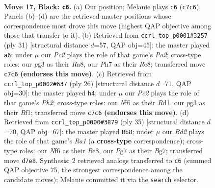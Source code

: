 \documentclass[11pt]{article}
\begin{document}
\clearpage

\begin{figure}[p]\centering
\begin{subfigure}{0.46\textwidth}\centering
\resizebox{\linewidth}{!}{%
\newchessgame
\chessboard[
  setfen={rr1q2k1/p1pb1ppp/4pn2/p7/2BPP2P/1P1Q1NP1/P4P2/R3R1K1 b - - 2 17},
  showmover=false,
  pgfstyle=straightmove, color=movearrow, markmove={c7-c6}
]}
\caption{}
\end{subfigure}\hfill
\begin{subfigure}{0.46\textwidth}\centering
\resizebox{\linewidth}{!}{%
\newchessgame
\chessboard[
  setfen={r3r1k1/pp1qbpp1/3ppn1p/8/P1PN4/3PB2P/1P2QPP1/R2R2K1 b - - 2 16},
  showmover=false,
  pgfstyle=straightmove, color=movearrow, markmove={a7-a6}
]}
\caption{}
\end{subfigure}
\\[4pt]
\begin{subfigure}{0.46\textwidth}\centering
\resizebox{\linewidth}{!}{%
\newchessgame
\chessboard[
  setfen={r3k2r/p1ppq1bp/1p2pnp1/8/2P5/P1N1PP2/1PQ3PP/1K1R1B1R w kq - 1 14},
  showmover=false,
  pgfstyle=straightmove, color=movearrow, markmove={h2-h4}
]}
\caption{}
\end{subfigure}\hfill
\begin{subfigure}{0.46\textwidth}\centering
\resizebox{\linewidth}{!}{%
\newchessgame
\chessboard[
  setfen={r2qr1k1/5pbp/p2p1np1/2pP4/P3P3/2NQ3P/1P3PP1/R1B2RK1 b - - 0 18},
  showmover=false,
  pgfstyle=straightmove, color=movearrow, markmove={a8-b8}
]}
\caption{}
\end{subfigure}
\caption{\textbf{Move 17, Black: \texttt{c6}.} (a) Our position; Melanie plays \texttt{c6} (\texttt{c7c6}). Panels (b)--(d) are the retrieved master positions whose correspondence most drove this move (highest QAP objective among those that transfer to it). (b) Retrieved from \texttt{ccrl\_top\_p0001\#3257} (ply 31) [structural distance $d$=57, QAP obj=45]: the master played \texttt{a6}; under $\mu$ our \emph{Pc2} plays the role of that game's \emph{Pa2}; cross-type roles: our \emph{p}g3 as their \emph{R}a8, our \emph{P}h7 as their \emph{R}e8; transferred move \texttt{c7c6} \textbf{(endorses this move)}. (c) Retrieved from \texttt{ccrl\_top\_p0002\#637} (ply 26) [structural distance $d$=71, QAP obj=30]: the master played \texttt{h4}; under $\mu$ our \emph{Pc2} plays the role of that game's \emph{Ph2}; cross-type roles: our \emph{N}f6 as their \emph{R}d1, our \emph{p}g3 as their \emph{B}f1; transferred move \texttt{c7c6} \textbf{(endorses this move)}. (d) Retrieved from \texttt{ccrl\_top\_p0000\#3879} (ply 35) [structural distance $d$=70, QAP obj=67]: the master played \texttt{Rb8}; under $\mu$ our \emph{Bd2} plays the role of that game's \emph{Ra1} (a \textbf{cross-type} correspondence); cross-type roles: our \emph{N}f6 as their \emph{R}e8, our \emph{P}g7 as their \emph{B}g7; transferred move \texttt{d7e8}. Synthesis: 2 retrieved analogs transferred to \texttt{c6} (summed QAP objective 75, the strongest correspondence among the candidate moves); Melanie committed it via the \texttt{search} selector.}
\label{fig:thought-m33}
\end{figure}
\end{document}
